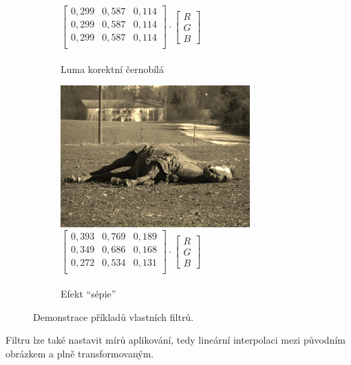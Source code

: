 \documentclass[11pt, a4paper, titlepage]{article}
\renewcommand{\uv}[1]{``#1''}
\begin{document}
\begin{figure}[h]
\begin{subfigure}[t]{0.3\textwidth}
        \caption{
            $
            \begin{bmatrix}
                0,299 & 0,587 & 0,114 \\
                0,299 & 0,587 & 0,114 \\
                0,299 & 0,587 & 0,114 \\
            \end{bmatrix}
            \cdot
            \begin{bmatrix}R\\G\\B\end{bmatrix}
            $\\\\Luma korektní černobílá
        }
    \end{subfigure}
    \hspace{0.1cm}
    \begin{subfigure}[t]{0.3\textwidth}
        \centering
        \vskip 0pt
        \includegraphics[width=0.8\textwidth]{horse_sepia.jpg}
        \caption{
            $
            \begin{bmatrix}
                0,393 & 0,769 & 0,189 \\
                0,349 & 0,686 & 0,168 \\
                0,272 & 0,534 & 0,131 \\
            \end{bmatrix}
            \cdot
            \begin{bmatrix}R\\G\\B\end{bmatrix}
            $\\\\Efekt \uv{sépie}\cite{Howtocon48:online}
        }
    \end{subfigure}
    \caption{Demonstrace příkladů vlastních filtrů.}
    \label{fig:custom-filters}
\end{figure}
Filtru lze také nastavit mírů aplikování, tedy lineární interpolaci mezi původním obrázkem a plně transformovaným.
\end{document}
